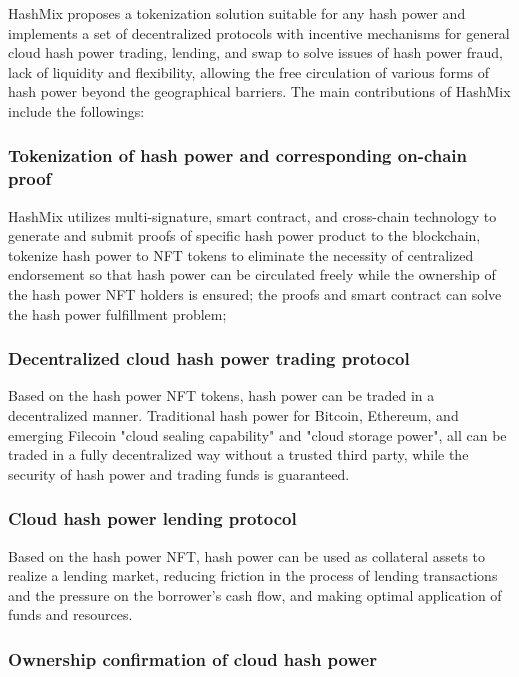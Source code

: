 \documentclass[]{template/llncs}
\begin{document}
HashMix proposes a tokenization solution suitable for any hash power and implements a set of decentralized protocols with incentive mechanisms for general cloud hash power trading, lending, and swap to solve issues of hash power fraud, lack of liquidity and flexibility, allowing the free circulation of various forms of hash power beyond the geographical barriers. The main contributions of HashMix include the followings:


\subsubsection{Tokenization of hash power and corresponding on-chain proof}

HashMix utilizes multi-signature, smart contract, and cross-chain technology to generate and submit proofs of specific hash power product to the blockchain, tokenize hash power to NFT tokens to eliminate the necessity of centralized endorsement so that hash power can be circulated freely while the ownership of the hash power NFT holders is ensured; the proofs and smart contract can solve the hash power fulfillment problem;


\subsubsection{Decentralized cloud hash power trading protocol}

Based on the hash power NFT tokens, hash power can be traded in a decentralized manner. Traditional hash power for Bitcoin, Ethereum, and emerging Filecoin "cloud sealing capability" and "cloud storage power", all can be traded in a fully decentralized way without a trusted third party, while the security of hash power and trading funds is guaranteed.

\subsubsection{Cloud hash power lending protocol}

Based on the hash power NFT, hash power can be used as collateral assets to realize a lending market, reducing friction in the process of lending transactions and the pressure on the borrower's cash flow, and making optimal application of funds and resources.


\subsubsection{Ownership confirmation of cloud hash power}
\end{document}
